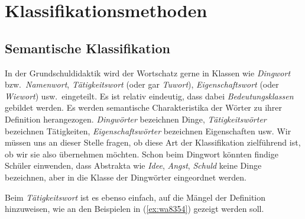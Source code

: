 

\section{Klassifikationsmethoden}

\label{sec:klassifikationsmethoden}

\subsection{Semantische Klassifikation}

\label{sec:semantischeklassifikation}


In der Grundschuldidaktik wird der Wortschatz gerne in Klassen wie \textit{Dingwort} bzw.\ \textit{Namenwort}, \textit{Tätigkeitswort} (oder gar \textit{Tuwort}), \textit{Eigenschaftswort} (oder \textit{Wiewort}) usw.\ eingeteilt.
Es ist relativ eindeutig, dass dabei \textit{Bedeutungsklassen} gebildet werden.
Es werden semantische Charakteristika der Wörter zu ihrer Definition herangezogen.
\textit{Dingwörter} bezeichnen Dinge, \textit{Tätigkeitswörter} bezeichnen Tätigkeiten, \textit{Eigenschaftswörter} bezeichnen Eigenschaften usw.
Wir müssen uns an dieser Stelle fragen, ob diese Art der Klassifikation zielführend ist, ob wir sie also übernehmen möchten.
Schon beim Dingwort könnten findige Schüler einwenden, dass Abstrakta wie \textit{Idee}, \textit{Angst}, \textit{Schuld} keine Dinge bezeichnen, aber in die Klasse der Dingwörter eingeordnet werden.

Beim \textit{Tätigkeitswort} ist es ebenso einfach, auf die Mängel der Definition hinzuweisen, wie an den Beispielen in (\ref{ex:wa8354}) gezeigt werden soll.

\begin{exe}
  \ex\label{ex:wa8354}
  \begin{xlist}
  \end{xlist}
\end{exe}

